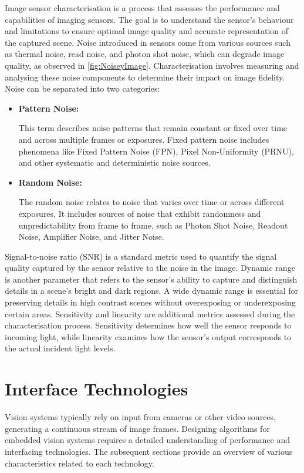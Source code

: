 Image sensor characterisation is a process that assesses the performance and capabilities of imaging sensors. The goal is to understand the sensor's behaviour and limitations to ensure optimal image quality and accurate representation of the captured scene. Noise introduced in sensors come from various sources such as thermal noise, read noise, and photon shot noise, which can degrade image quality, as observed in \ref{fig:NoiseyImage}. Characterisation involves measuring and analysing these noise components to determine their impact on image fidelity. Noise can be separated into two categories:

\begin{itemize}
  \item \textbf{Pattern Noise:}
  \par
  This term describes noise patterns that remain constant or fixed over time and across multiple frames or exposures. Fixed pattern noise includes phenomena like Fixed Pattern Noise (FPN), Pixel Non-Uniformity (PRNU), and other systematic and deterministic noise sources.

  \item \textbf{Random Noise:}
  \par
  The random noise relates to noise that varies over time or across different exposures. It includes sources of noise that exhibit randomness and unpredictability from frame to frame, such as Photon Shot Noise, Readout Noise, Amplifier Noise, and Jitter Noise.
\end{itemize}

Signal-to-noise ratio (SNR) is a standard metric used to quantify the signal quality captured by the sensor relative to the noise in the image. Dynamic range is another parameter that refers to the sensor's ability to capture and distinguish details in a scene's bright and dark regions. A wide dynamic range is essential for preserving details in high contrast scenes without overexposing or underexposing certain areas. Sensitivity and linearity are additional metrics assessed during the characterisation process. Sensitivity determines how well the sensor responds to incoming light, while linearity examines how the sensor's output corresponds to the actual incident light levels.



\section{Interface Technologies}
Vision systems typically rely on input from cameras or other video sources, generating a continuous stream of image frames. Designing algorithms for embedded vision systems requires a detailed understanding of performance and interfacing technologies. The subsequent sections provide an overview of various characteristics related to each technology.

